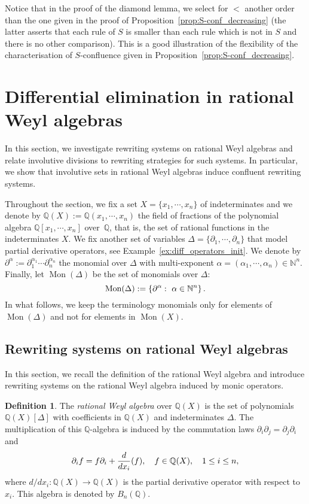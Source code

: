 \documentclass[11pt]{article}
\theoremstyle{definition}
\newtheorem{definition}[theorem]{Definition}
\newcommand\diff[1]{\partial_{#1}}
\newcommand\Q{\mathbb{Q}}
\newcommand\N{\mathbb{N}}
\newcommand\QX{\mathbb{Q}[x_1,\cdots,x_n]}
\newcommand\QXX{\mathbb{Q}(x_1,\cdots,x_n)}
\newcommand\Weyl[1]{B_{#1}(\Q)}
\newcommand\monBasis{\Mon(\Delta)}
\DeclareMathOperator{\Mon}{Mon}
\begin{document}
Notice that in the proof of the diamond lemma, we select for $<$ another order
than the one given in the proof of Proposition~\ref{prop:S-conf_decreasing} (the
latter asserts that each rule of $S$ is smaller than each rule which is not in
$S$ and there is no other comparison). This is a good illustration of the
flexibility of the characterisation of $S$-confluence given in
Proposition~\ref{prop:S-conf_decreasing}. 

\section{Differential elimination in rational Weyl algebras}
\label{sec:differential_elimination_in_rational_Weyl_algebras}

In this section, we investigate rewriting systems on rational Weyl
algebras and relate involutive divisions to rewriting strategies for such
systems. In particular, we show that involutive sets in rational Weyl
algebras induce confluent rewriting systems.
\medskip

Throughout the section, we fix a set $X=\{x_1,\cdots,x_n\}$ of
indeterminates and we denote by $\Q(X):=\QXX$ the field of fractions of
the polynomial algebra $\QX$ over~$\Q$, that is, the set of rational
functions in the indeterminates $X$. We fix another set of variables
$\Delta=\{\diff{1},\cdots,\diff{n}\}$ that model partial derivative
operators, see Example~\ref{ex:diff_operators_init}. We denote by
$\partial^{\alpha}:=\diff{1}^{\alpha_1}\cdots\diff{n}^{\alpha_n}$ the
monomial over $\Delta$ with multi-exponent
$\alpha=(\alpha_1,\cdots,\alpha_n)\in\N^n$. Finally, let $\monBasis$ be
the set of monomials over $\Delta$:
\[\monBasis:=\left\{\partial^\alpha:\ \alpha\in\N^n\right\}.
\smallskip\]
In what follows, we keep the terminology monomials only for elements of
$\Mon(\Delta)$ and not for elements in $\Mon(X)$.

\subsection{Rewriting systems on rational Weyl algebras}
\label{sec:rewriting_systems_on_Weyl_algebras}

In this section, we recall the definition of the rational Weyl algebra
and introduce rewriting systems on the rational Weyl algebra induced by
monic operators.
\medskip

\begin{definition}
  The {\it rational Weyl algebra} over $\Q(X)$ is the set of polynomials
  $\Q(X)[\Delta]$ with coefficients in $\Q(X)$ and indeterminates
  $\Delta$. The multiplication of this $\mathbb Q$-algebra is induced by
  the commutation laws $\partial_i\partial_j=\partial_j\partial_i$ and
  \[\diff{i}f=f\diff{i}+\frac{d}{dx_i}(f),\quad f\in\Q(X),\quad
  1\leq i\leq n,
  \smallskip\]
  where $d/dx_i:\Q(X)\to\Q(X)$ is the partial derivative operator with
  respect to~$x_i$. This algebra is denoted by $\Weyl{n}$.
\end{definition}
\smallskip
\end{document}
